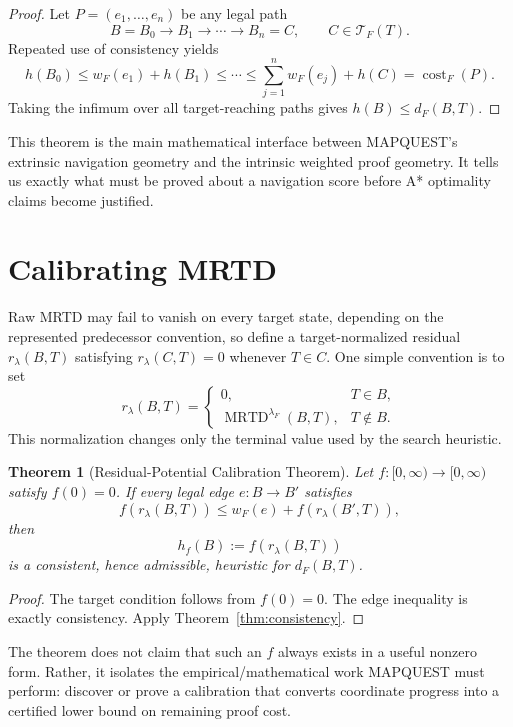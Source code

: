\documentclass[11pt]{article}
\newtheorem{theorem}{Theorem}[section]
\theoremstyle{definition}
\theoremstyle{remark}
\newcommand{\MRTD}{\operatorname{MRTD}}
\newcommand{\cost}{\operatorname{cost}}
\begin{document}
\begin{proof}
Let $P=(e_1,\dots,e_n)$ be any legal path
\[
B=B_0\to B_1\to\cdots\to B_n=C,
\qquad C\in\mathcal T_F(T).
\]
Repeated use of consistency yields
\[
h(B_0)\le w_F(e_1)+h(B_1)
\le\cdots\le\sum_{j=1}^n w_F(e_j)+h(C)
=\cost_F(P).
\]
Taking the infimum over all target-reaching paths gives $h(B)\le d_F(B,T)$.
\end{proof}

This theorem is the main mathematical interface between MAPQUEST's extrinsic navigation geometry and the intrinsic weighted proof geometry. It tells us exactly what must be proved about a navigation score before A* optimality claims become justified.

\section{Calibrating MRTD}

Raw MRTD may fail to vanish on every target state, depending on the represented predecessor convention, so define a target-normalized residual $r_\lambda(B,T)$ satisfying $r_\lambda(C,T)=0$ whenever $T\in C$. One simple convention is to set
\[
r_\lambda(B,T)=
\begin{cases}
0,&T\in B,\\
\MRTD^{\lambda_F}(B,T),&T\notin B.
\end{cases}
\]
This normalization changes only the terminal value used by the search heuristic.

\begin{theorem}[Residual-Potential Calibration Theorem]\label{thm:calibration}
Let $f:[0,\infty)\to[0,\infty)$ satisfy $f(0)=0$. If every legal edge $e:B\to B'$ satisfies
\[
f(r_\lambda(B,T))
\le
w_F(e)+f(r_\lambda(B',T)),
\]
then
\[
h_f(B):=f(r_\lambda(B,T))
\]
is a consistent, hence admissible, heuristic for $d_F(B,T)$.
\end{theorem}

\begin{proof}
The target condition follows from $f(0)=0$. The edge inequality is exactly consistency. Apply Theorem~\ref{thm:consistency}.
\end{proof}

The theorem does not claim that such an $f$ always exists in a useful nonzero form. Rather, it isolates the empirical/mathematical work MAPQUEST must perform: discover or prove a calibration that converts coordinate progress into a certified lower bound on remaining proof cost.
\end{document}
